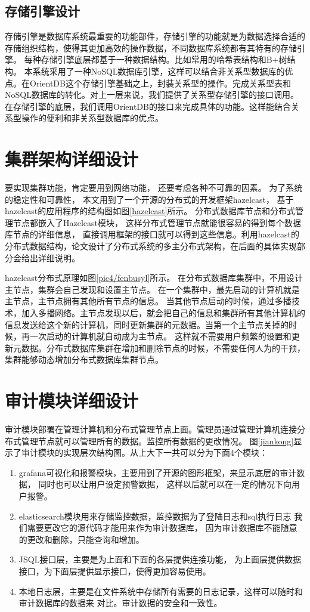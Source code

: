 \subsection{存储引擎设计}
存储引擎是数据库系统最重要的功能部件，存储引擎的功能就是为数据选择合适的存储组织结构，使得其更加高效的操作数据，不同数据库系统都有其特有的存储引擎。
每种存储引擎底层都基于一种数据结构。比如常用的哈希表结构和B+树结构。
本系统采用了一种NoSQL数据库引擎，这样可以结合非关系型数据库的优点。在OrientDB这个存储引擎基础之上，封装关系型的操作。完成关系型表和NoSQL数据库的转化。对上一层来说，我们提供了关系型存储引擎的接口调用。在存储引擎的底层，我们调用OrientDB的接口来完成具体的功能。这样能结合关系型操作的便利和非关系型数据库的优点。
\section{集群架构详细设计}
要实现集群功能，肯定要用到网络功能，
还要考虑各种不可靠的因素。
为了系统的稳定性和可靠性，
本文用到了一个开源的分布式的开发框架hazelcast，
基于hazelcast的应用程序的结构图如图\ref{hazelcast}所示。
分布式数据库节点和分布式管理节点都嵌入了Hazelcast模块，
这样分布式管理节点就能很容易的得到每个数据库节点的详细信息，
直接调用框架的接口就可以得到这些信息。利用hazelcast的分布式数据结构，论文设计了分布式系统的多主分布式架构，在后面的具体实现部分会给出详细说明。

hazelcast分布式原理如图\ref{pic4/fenbusyl}所示。
在分布式数据库集群中，不用设计主节点，集群会自己发现和设置主节点。
在一个集群中，最先启动的计算机就是主节点，主节点拥有其他所有节点的信息。
当其他节点启动的时候，通过多播技术，加入多播网络。主节点发现以后，就会把自己的信息和集群所有其他计算机的信息发送给这个新的计算机，同时更新集群的元数据。当第一个主节点关掉的时候，再一次启动的计算机就自动成为主节点。
这样就不需要用户频繁的设置和更新元数据。分布式数据库集群在增加和删除节点的时候，不需要任何人为的干预，集群能够动态增加分布式数据库集群节点。
\section{审计模块详细设计}
审计模块部署在管理计算机和分布式管理节点上面。管理员通过管理计算机连接分布式管理节点就可以管理所有的数据。监控所有数据的更改情况。
图\ref{jiankong}显示了审计模块的实现层次结构图。从上大下一共可以分为下面4个模块：
\begin{enumerate}[fullwidth,itemindent=2em,listparindent=2em]
	\item grafana可视化和报警模块，主要用到了开源的图形框架，来显示底层的审计数据，
	同时也可以让用户设定预警数据，
	这样以后就可以在一定的情况下向用户报警。
	\item elasticsearch模块用来存储监控数据，监控数据为了登陆日志和sql执行日志
	我们需要更改它的源代码才能用来作为审计数据库，
	因为审计数据库不能随意的更改和删除，只能查询和增加。
	\item JSQL接口层，主要是为上面和下面的各层提供连接功能，
	为上面层提供数据接口，为下面层提供显示接口，使得更加容易使用。
	\item 本地日志层，主要是在文件系统中存储所有需要的日志记录，这样可以随时和审计数据库的数据来
	对比。审计数据的安全和一致性。
\end{enumerate}
